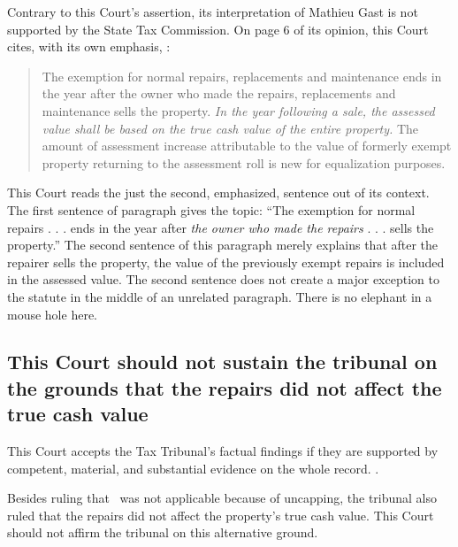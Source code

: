 \documentclass[12pt,\documentclassflag]{michiganCourtOfAppealsBrief}
\begin{document}
Contrary to this Court's assertion, its interpretation of Mathieu Gast is not supported by the State Tax Commission. On page 6 of its opinion, this Court cites, with its own emphasis, :

\begin{quote}
The exemption for normal repairs, replacements and maintenance ends in the year after the
owner who made the repairs, replacements and maintenance sells the property. \emph{In the year
following a sale, the assessed value shall be based on the true cash value of the entire property.}
The amount of assessment increase attributable to the value of formerly exempt property
returning to the assessment roll is new for equalization purposes.
\end{quote}

This Court reads the just the second, emphasized, sentence out of its context. The first sentence of paragraph gives the topic: ``The exemption for normal repairs . . . ends in the year after \emph{the owner who made the repairs} . . . sells the property.'' The second sentence of this paragraph merely explains that after the repairer sells the property, the value of the previously exempt repairs is included in the assessed value. The second sentence does not create a major exception to the statute in the middle of an unrelated paragraph. There is no elephant in a mouse hole here.


\subsection{This Court should not sustain the tribunal on the grounds that the repairs did not affect the true cash value}

This Court accepts the Tax Tribunal's factual findings if they are supported by competent, material, and substantial evidence on the whole record. .

Besides ruling that \mathieuGast\ was not applicable because of uncapping, the tribunal also ruled that the repairs did not affect the property's true cash value. This Court should not affirm the tribunal on this alternative ground.
\end{document}
